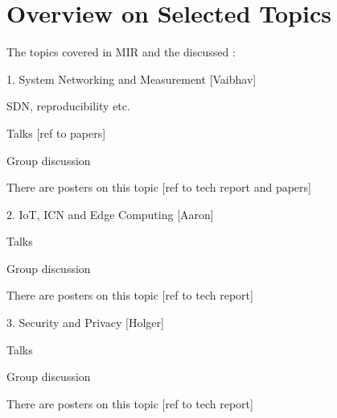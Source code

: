 \section{Overview on Selected Topics} \label{sec:content}

The topics covered in MIR and the discussed : 

1. System Networking and Measurement [Vaibhav]

SDN, reproducibility etc.

Talks [ref to papers]

Group discussion

There are posters on this topic [ref to tech report and papers]


2. IoT, ICN and Edge Computing [Aaron]

Talks

Group discussion

There are posters on this topic [ref to tech report]


3. Security and Privacy [Holger]

Talks

Group discussion

There are posters on this topic [ref to tech report]